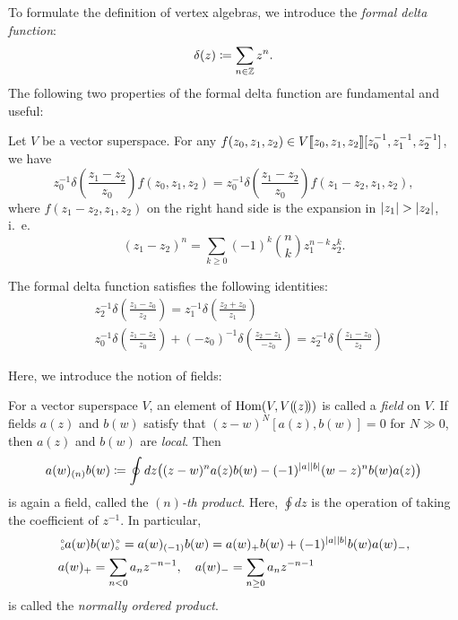 \documentclass[final,reqno]{amsart}
\begin{document}
To formulate the definition of vertex algebras, we introduce the \emph{formal delta function}: 
\[
    \delta(z)\coloneqq \sum_{n\in \mathbb{Z}}z^n.
\]    
The following two properties of the formal delta function are fundamental and useful: 
\begin{prp}\label{prp:basic property of formal delta funtion}
    Let $V$ be a vector superspace. For any $f(z_0,z_1,z_2)\in V\llbracket z_0,z_1,z_2 \rrbracket[z_0^{-1},z_1^{-1},z_2^{-1}]$, we have
    \[
        z_0^{-1}\delta\left(\frac{z_1-z_2}{z_0}\right)f(z_0,z_1,z_2)=z_0^{-1}\delta\left(\frac{z_1-z_2}{z_0}\right)f(z_1-z_2,z_1,z_2),
    \]
    where $f(z_1-z_2,z_1,z_2)$ on the right hand side is the expansion in $\abs{z_1}>\abs{z_2}$, i.\ e.\ 
    \[
        (z_1-z_2)^n=\sum_{k\geq 0}(-1)^k\binom{n}{k}z_1^{n-k}z_2^k.
    \]
\end{prp}

\begin{prp}
    The formal delta function satisfies the following identities:
    \begin{align}
        &z_2^{-1}\delta\left(\frac{z_1-z_0}{z_2}\right)=z_1^{-1}\delta\left(\frac{z_2+z_0}{z_1}\right) \label{eq: skew symmetry}\\
        &z_0^{-1}\delta\left(\frac{z_1-z_2}{z_0}\right)+(-z_0)^{-1}\delta\left(\frac{z_2-z_1}{-z_0}\right)=z_2^{-1}\delta\left(\frac{z_1-z_0}{z_2}\right) \label{eq: Jacobi identity}
    \end{align}
\end{prp}

Here, we introduce the notion of fields:
\begin{dfn}\label{dfn: local field and n-th product}
    For a vector superspace $V$, an element of $\operatorname{Hom}(V,V(\!( z )\!))$ is called a \emph{field} on $V$. If fields $a(z)$ and $b(w)$ satisfy that $(z-w)^N[a(z),b(w)]=0$ for $N\gg 0$, then $a(z)$ and $b(w)$ are \emph{local}. Then 
    \[
        a(w)_{(n)}b(w)\coloneqq \oint dz \bigl((z-w)^na(z)b(w)-(-1)^{\left| a \right|\left| b \right|}(w-z)^nb(w)a(z)\bigr)
    \]
    is again a field, called the \emph{$(n)$-th product}. Here, $\oint dz$ is the operation of taking the coefficient of $z^{-1}$. In particular, 
    \[
        \begin{split}
            &\,\substack{\scriptscriptstyle\circ \\ \scriptscriptstyle\circ} a(w)b(w) \substack{\scriptscriptstyle\circ \\ \scriptscriptstyle\circ\,}=a(w)_{(-1)}b(w)=a(w)_+b(w)+(-1)^{\left| a \right|\left| b \right|}b(w)a(w)_-,\\
            &a(w)_+=\sum_{n<0}a_nz^{-n-1},\quad a(w)_-=\sum_{n\geq 0}a_nz^{-n-1}
        \end{split}
    \]
    is called the \emph{normally ordered product}.
\end{dfn}
\end{document}
